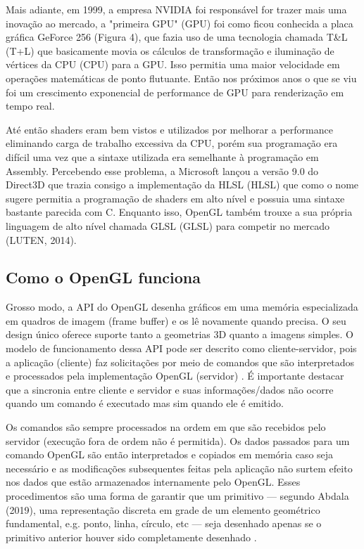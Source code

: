 Mais adiante, em 1999, a empresa NVIDIA foi responsável for trazer mais uma inovação ao mercado, a "primeira GPU" (\acrlong{GPU}) foi como ficou conhecida a placa gráfica GeForce 256 (Figura 4), que fazia uso de uma tecnologia chamada T\&L (\acrlong{T+L}) que basicamente movia os cálculos de transformação e iluminação de vértices da CPU (\acrlong{CPU}) para a \acrshort{GPU}. Isso permitia uma maior velocidade em operações matemáticas de ponto flutuante. Então nos próximos anos o que se viu foi um crescimento exponencial de performance de \acrshort{GPU} para renderização em tempo real.

Até então shaders eram bem vistos e utilizados por melhorar a performance eliminando carga de trabalho excessiva da \acrshort{CPU}, porém sua programação era difícil uma vez que a sintaxe utilizada era semelhante à programação em Assembly. Percebendo esse problema, a Microsoft lançou a versão 9.0 do Direct3D que trazia consigo a implementação da HLSL (\acrlong{HLSL}) que como o nome sugere permitia a programação de shaders em alto nível e possuia uma sintaxe bastante parecida com C. Enquanto isso, OpenGL também trouxe a sua própria linguagem de alto nível chamada GLSL (\acrlong{GLSL}) para competir no mercado (LUTEN, 2014)\nocite{openGLBook}. 

\subsection{Como o OpenGL funciona}
\label{sec:como-opengl-funciona}

Grosso modo, a API do OpenGL desenha gráficos em uma memória especializada em quadros de imagem (frame buffer) e os lê novamente quando precisa. O seu design único oferece suporte tanto a geometrias 3D quanto a imagens simples. O modelo de funcionamento dessa API pode ser descrito como cliente-servidor, pois a aplicação (cliente) faz solicitações por meio de comandos que são interpretados e processados pela implementação OpenGL (servidor) \cite{GLSLBook}. É importante destacar que a sincronia entre cliente e servidor e suas informações/dados não ocorre quando um comando é executado mas sim quando ele é emitido.

Os comandos são sempre processados na ordem em que são recebidos pelo servidor (execução fora de ordem não é permitida). Os dados passados para um comando OpenGL são então interpretados e copiados em memória caso seja necessário e as modificações subsequentes feitas pela aplicação não surtem efeito nos dados que estão armazenados internamente pelo OpenGL. Esses procedimentos são uma forma de garantir que um primitivo --- segundo Abdala (2019)\nocite{abdala}, uma representação discreta em grade de um elemento geométrico fundamental, e.g. ponto, linha, círculo, etc --- seja desenhado apenas se o primitivo anterior houver sido completamente desenhado \cite{GLSLBook}.

